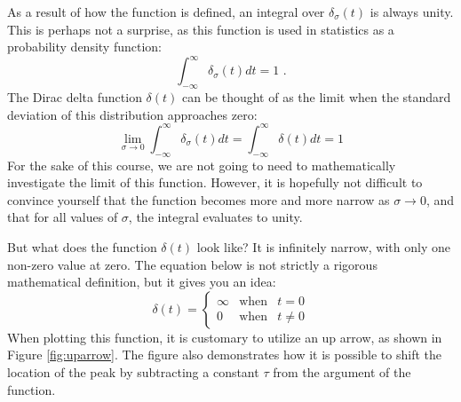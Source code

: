 As a result of how the function is defined, an integral over
$\delta_{\sigma}(t)$ is always unity. This is perhaps not a surprise,
as this function is used in statistics as a probability density
function:
\begin{equation}
  \int_{-\infty}^{\infty}\delta_\sigma(t)dt = 1 \,\,.
\end{equation}
The Dirac delta function $\delta(t)$ can be thought of as the limit
when the standard deviation of this distribution approaches zero:
\begin{equation}
  \lim_{\sigma\rightarrow 0}  \int_{-\infty}^{\infty} \delta_\sigma(t) dt = \int_{-\infty}^{\infty} \delta(t) dt = 1
\end{equation}
For the sake of this course, we are not going to need to
mathematically investigate the limit of this function. However, it is
hopefully not difficult to convince yourself that the function becomes
more and more narrow as $\sigma \rightarrow 0$, and that for all
values of $\sigma$, the integral evaluates to unity.

But what does the function $\delta(t)$ look like? It is infinitely
narrow, with only one non-zero value at zero. The equation below is
not strictly a rigorous mathematical definition, but it gives you an
idea:
\begin{equation}
  \delta(t) = \left\{ \begin{array}{ccc}
    \infty & \mathrm{when} & t=0     \\
    0      & \mathrm{when} & t \ne 0
  \end{array}\right.
\end{equation}
When plotting this function, it is customary to utilize an up arrow,
as shown in Figure \ref{fig:uparrow}. The figure also demonstrates how
it is possible to shift the location of the peak by subtracting a
constant $\tau$ from the argument of the function.

